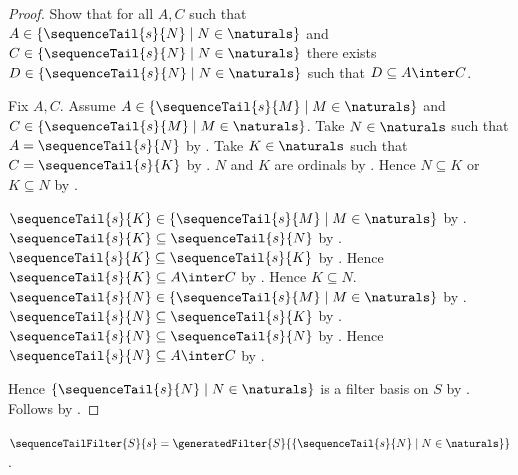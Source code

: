 \begin{proof}
    Show that for all $A,C$ such that
        $A\in\{\sequenceTail{s}{N}\mid N\in\naturals\}$ and
        $C\in\{\sequenceTail{s}{N}\mid N\in\naturals\}$
        there exists
        $D\in\{\sequenceTail{s}{N}\mid N\in\naturals\}$ such that
        $D\subseteq A\inter C$.
    \begin{subproof}
        Fix $A,C$.
        Assume $A\in\{\sequenceTail{s}{M}\mid M\in\naturals\}$ and
            $C\in\{\sequenceTail{s}{M}\mid M\in\naturals\}$.
        Take $N\in\naturals$ such that $A=\sequenceTail{s}{N}$
            by .
        Take $K\in\naturals$ such that $C=\sequenceTail{s}{K}$
            by .
        $N$ and $K$ are ordinals by .
        Hence $N\subseteq K$ or $K\subseteq N$
            by .
        \begin{byCase}
            $\sequenceTail{s}{K}\in
                \{\sequenceTail{s}{M}\mid M\in\naturals\}$ by
                .
            $\sequenceTail{s}{K}\subseteq\sequenceTail{s}{N}$
                by .
            $\sequenceTail{s}{K}\subseteq\sequenceTail{s}{K}$
                by .
            Hence $\sequenceTail{s}{K}\subseteq A\inter C$
                by .
            Hence $K\subseteq N$.
            $\sequenceTail{s}{N}\in
                \{\sequenceTail{s}{M}\mid M\in\naturals\}$ by
                .
            $\sequenceTail{s}{N}\subseteq\sequenceTail{s}{K}$
                by .
            $\sequenceTail{s}{N}\subseteq\sequenceTail{s}{N}$
                by .
            Hence $\sequenceTail{s}{N}\subseteq A\inter C$
                by .
        \end{byCase}
    \end{subproof}
    Hence $\{\sequenceTail{s}{N}\mid N\in\naturals\}$
        is a filter basis on $S$ by .
    Follows by .
\end{proof}

\begin{definition}\label{sequence_tail_filter}
    $\sequenceTailFilter{S}{s}=
        \generatedFilter{S}
            {\{\sequenceTail{s}{N}\mid N\in\naturals\}}$.
\end{definition}

